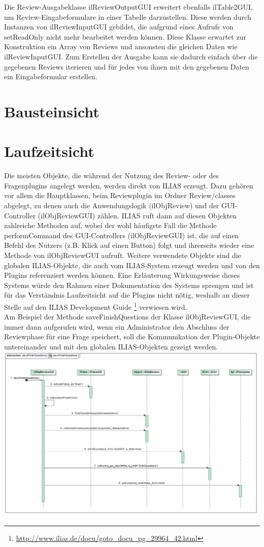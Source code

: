 \documentclass[a4paper]{scrreprt}
\begin{document}
Die Review-Ausgabeklasse ilReviewOutputGUI erweitert ebenfalls ilTable2GUI, um Review-Eingabeformulare in einer Tabelle darzustellen. Diese werden durch Instanzen von ilReviewInputGUI gebildet, die aufgrund eines Aufrufs von setReadOnly nicht mehr bearbeitet werden können. Diese Klasse erwartet zur Konstruktion ein Array von Reviews und ansonsten die gleichen Daten wie ilReviewInputGUI. Zum Erstellen der Ausgabe kann sie dadurch einfach über die gegebenen Reviews iterieren und für jedes von ihnen mit den gegebenen Daten ein Eingabeformular erstellen.
\chapter{Bausteinsicht}
\chapter{Laufzeitsicht}
Die meisten Objekte, die während der Nutzung des Review- oder des Fragenplugins angelegt werden, werden direkt von ILIAS erzeugt. Dazu gehören vor allem die Hauptklassen, beim Reviewplugin im Ordner Review/classes abgelegt, zu denen auch die Anwendungslogik (ilObjReview) und der GUI-Controller (ilObjReviewGUI) zählen. ILIAS ruft dann auf diesen Objekten zahlreiche Methoden auf, wobei der wohl häufigste Fall die Methode performCommand des GUI-Controllers (ilObjReviewGUI) ist, die auf einen Befehl des Nutzers (z.B. Klick auf einen Button) folgt und ihrerseits wieder eine Methode von ilObjReviewGUI aufruft. Weitere verwendete Objekte sind die globalen ILIAS-Objekte, die auch vom ILIAS-System erzeugt werden und von den Plugins referenziert werden können. Eine Erläuterung Wirkungsweise dieses Systems würde den Rahmen einer Dokumentation des Systems sprengen und ist für das Verständnis Laufzeitsicht auf die Plugins nicht nötig, weshalb an dieser Stelle auf den ILIAS Development Guide \footnote{\url{http://www.ilias.de/docu/goto_docu_pg_29964_42.html}} verwiesen wird.\\
Am Beispiel der Methode saveFinishQuestions der Klasse ilObjReviewGUI, die immer dann aufgerufen wird, wenn ein Administrator den Abschluss der Reviewphase für eine Frage speichert, soll die Kommunikation der Plugin-Objekte untereinander und mit den globalen ILIAS-Objekten gezeigt werden.
\includegraphics[width=1.0\textwidth]{Sequence_Diagram__saveFinishQuestions__saveFinishQuestions.png}
\end{document}
